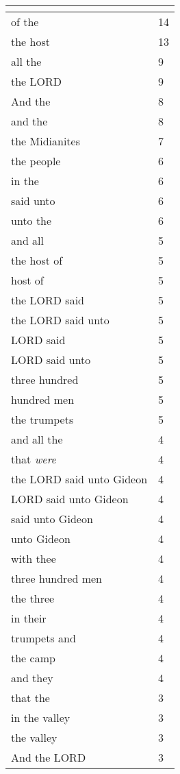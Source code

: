 \begin{center}
\begin{longtable}{|p{3.0in}|p{0.5in}|}
\hline \multicolumn{2}{c}{{ }} \\ \hline
\endfoot 
of the & 14\\ \hline 
the host & 13\\ \hline 
all the & 9\\ \hline 
the LORD & 9\\ \hline 
And the & 8\\ \hline 
and the & 8\\ \hline 
the Midianites & 7\\ \hline 
the people & 6\\ \hline 
in the & 6\\ \hline 
said unto & 6\\ \hline 
unto the & 6\\ \hline 
and all & 5\\ \hline 
the host of & 5\\ \hline 
host of & 5\\ \hline 
the LORD said & 5\\ \hline 
the LORD said unto & 5\\ \hline 
LORD said & 5\\ \hline 
LORD said unto & 5\\ \hline 
three hundred & 5\\ \hline 
hundred men & 5\\ \hline 
the trumpets & 5\\ \hline 
and all the & 4\\ \hline 
that \emph{were} & 4\\ \hline 
the LORD said unto Gideon & 4\\ \hline 
LORD said unto Gideon & 4\\ \hline 
said unto Gideon & 4\\ \hline 
unto Gideon & 4\\ \hline 
with thee & 4\\ \hline 
three hundred men & 4\\ \hline 
the three & 4\\ \hline 
in their & 4\\ \hline 
trumpets and & 4\\ \hline 
the camp & 4\\ \hline 
and they & 4\\ \hline 
that the & 3\\ \hline 
in the valley & 3\\ \hline 
the valley & 3\\ \hline 
And the LORD & 3\\ \hline 

\end{longtable}
\end{center}
